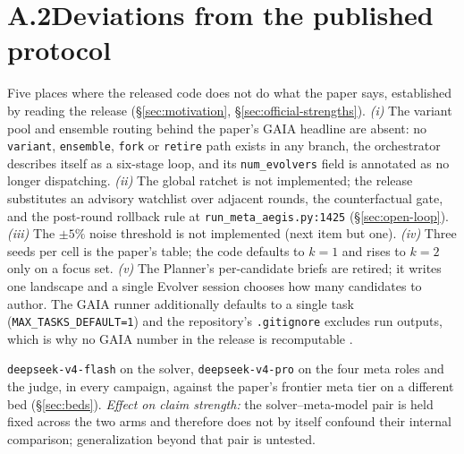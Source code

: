 \section*{A.2\quad Deviations from the published protocol}

\begin{description}[leftmargin=1.4em,style=nextline,itemsep=5pt]

  \item[\textnormal{\textbf{Paper-versus-release divergences.}}] Five
        places where the released code does not do what the paper says,
        established by reading the release (\S\ref{sec:motivation},
        \S\ref{sec:official-strengths}). \emph{(i)} The variant pool and
        ensemble routing behind the paper's GAIA headline are absent: no
        \texttt{variant}, \texttt{ensemble}, \texttt{fork} or
        \texttt{retire} path exists in any branch, the orchestrator
        describes itself as a six-stage loop, and its \texttt{num\_evolvers}
        field is annotated as no longer dispatching. \emph{(ii)} The global
        ratchet is not implemented; the release substitutes an advisory
        watchlist over adjacent rounds, the counterfactual gate, and the
        post-round rollback rule at \texttt{run\_meta\_aegis.py:1425}
        (\S\ref{sec:open-loop}). \emph{(iii)} The $\pm 5\%$ noise threshold
        is not implemented (next item but one). \emph{(iv)} Three seeds per
        cell is the paper's table; the code defaults to $k{=}1$ and rises
        to $k{=}2$ only on a focus set. \emph{(v)} The Planner's
        per-candidate briefs are retired; it writes one landscape and a
        single Evolver session chooses how many candidates to author. The
        GAIA runner additionally defaults to a single task
        (\texttt{MAX\_TASKS\_DEFAULT=1}) and the repository's
        \texttt{.gitignore} excludes run outputs, which is why no GAIA
        number in the release is recomputable .

  \item[\textnormal{\textbf{Model tier.}}] \begingroup\sloppy
        \texttt{deepseek-\allowbreak v4-\allowbreak flash} on the solver,
        \texttt{deepseek-\allowbreak v4-\allowbreak pro} on the four meta roles and the judge,
        in every campaign, against the paper's frontier meta tier on a
        different bed (\S\ref{sec:beds}). \emph{Effect on claim strength:} the solver--meta-model pair is held fixed
        across the two arms and therefore does not by itself confound their
        internal comparison; generalization beyond that pair is untested.\par\endgroup


\end{description}
